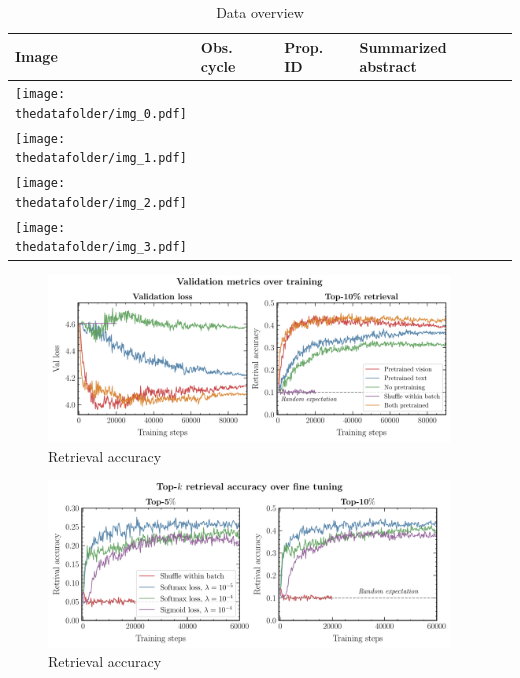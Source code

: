 \documentclass[10pt]{article} %
\begin{document}
\begin{table}[h!]
      \centering
      \begin{tabular}{m{} p{1.9cm} p{1.9cm} m{8cm}}
          \toprule
          \centering \bfseries Image & \centering \bfseries Obs. cycle & \centering \bfseries Prop. ID & \centering \bfseries Summarized abstract \tabularnewline
          \midrule
          \centering \texttt{[image: \\thedatafolder/img\_0.pdf]} & \centering  & \centering  &  {\scriptsize } \tabularnewline
          \midrule
          \centering \texttt{[image: \\thedatafolder/img\_1.pdf]} & \centering  & \centering  &  {\scriptsize } \tabularnewline
          \midrule
          \centering \texttt{[image: \\thedatafolder/img\_2.pdf]} & \centering  & \centering  &  {\scriptsize } \tabularnewline
          \midrule
          \centering \texttt{[image: \\thedatafolder/img\_3.pdf]} & \centering  & \centering  &  {\scriptsize } \tabularnewline
          \bottomrule
      \end{tabular}
      \caption{Data overview}
  \end{table}
  

\begin{figure}[!h]
      \includegraphics[width=0.95\textwidth]{plots/val_metrics.pdf}
      \caption{Retrieval accuracy}
      \label{fig:retrieval_acc}
      \end{figure}
      

\begin{figure}[!h]
\includegraphics[width=0.95\textwidth]{plots/retrieval_acc.pdf}
\caption{Retrieval accuracy}
\label{fig:retrieval_acc}
\end{figure}
\end{document}
